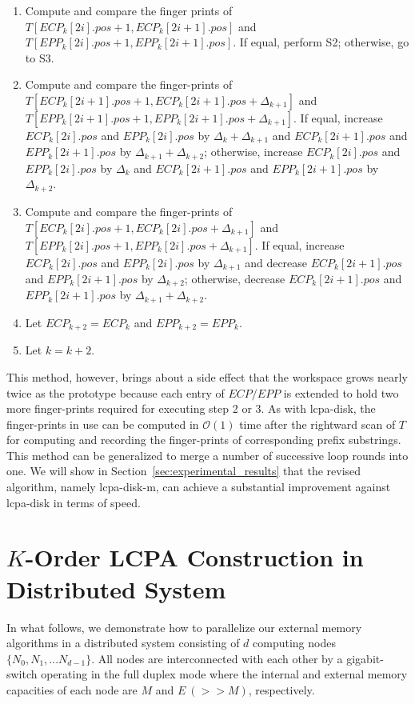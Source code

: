 \documentclass[article]{IEEEtran}
\theoremstyle{definition}
\theoremstyle{remark}
\numberwithin{equation}{section}
\begin{document}
\begin{enumerate}
\item Compute and compare the finger prints of $T[ECP_k[2i].pos+1,ECP_k[2i+1].pos]$ and $T[EPP_k[2i].pos+1,EPP_k[2i+1].pos]$. If equal, perform S2; otherwise, go to S3.
\item Compute and compare the finger-prints of $T[ECP_k[2i+1].pos+1,ECP_k[2i+1].pos+\Delta_{k+1}]$ and $T[EPP_k[2i+1].pos+1,EPP_k[2i+1].pos+\Delta_{k+1}]$. If equal, increase $ECP_k[2i].pos$ and $EPP_k[2i].pos$ by $\Delta_{k}+\Delta_{k+1}$ and $ECP_k[2i+1].pos$ and $EPP_k[2i+1].pos$ by $\Delta_{k+1}+\Delta_{k+2}$; otherwise, increase $ECP_k[2i].pos$ and $EPP_k[2i].pos$ by $\Delta_{k}$ and $ECP_k[2i+1].pos$ and $EPP_k[2i+1].pos$ by $\Delta_{k+2}$.
\item Compute and compare the finger-prints of $T[ECP_k[2i].pos+1,ECP_k[2i].pos+\Delta_{k+1}]$ and $T[EPP_k[2i].pos+1,EPP_k[2i].pos+\Delta_{k+1}]$. If equal, increase $ECP_k[2i].pos$ and $EPP_k[2i].pos$ by $\Delta_{k+1}$ and decrease $ECP_k[2i+1].pos$ and $EPP_k[2i+1].pos$ by $\Delta_{k+2}$; otherwise, decrease $ECP_k[2i+1].pos$ and $EPP_k[2i+1].pos$ by $\Delta_{k+1}+\Delta_{k+2}$.
\item Let $ECP_{k+2}=ECP_{k}$ and $EPP_{k+2}=EPP_{k}$.
\item Let $k = k+2$.
\end{enumerate}

This method, however, brings about a side effect that the workspace grows nearly twice as the prototype because each entry of $ECP/EPP$ is extended to hold two more finger-prints required for executing step 2 or 3. As with lcpa-disk, the finger-prints in use can be computed in $\mathcal{O}(1)$ time after the rightward scan of $T$ for computing and recording the finger-prints of corresponding prefix substrings. This method can be generalized to merge a number of successive loop rounds into one.  We will show in Section~\ref{sec:experimental_results} that the revised algorithm, namely lcpa-disk-m, can achieve a substantial improvement against lcpa-disk in terms of speed.

\section{$K$-Order LCPA Construction in Distributed System}\label{sec:construction_in_distributed}

In what follows, we demonstrate how to parallelize our external memory algorithms in a distributed system consisting of $d$ computing nodes $\{N_0, N_1, ...N_{d-1}\}$. All nodes are interconnected with each other by a gigabit-switch operating in the full duplex mode where the internal and external memory capacities of each node are $M$ and $E~(>> M)$, respectively.
\end{document}
